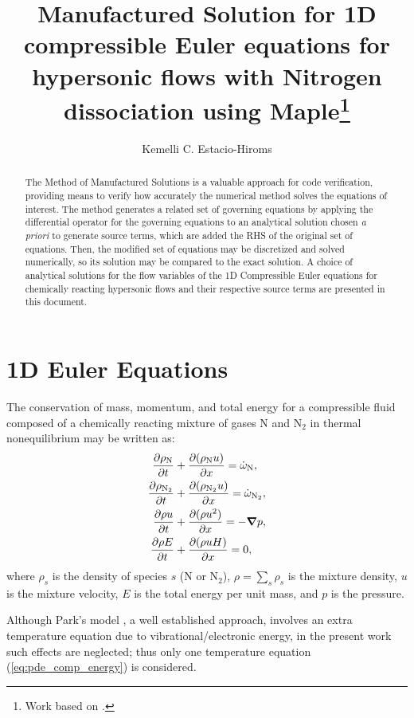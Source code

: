 \documentclass[10pt]{article}
\title{Manufactured Solution for 1D compressible Euler equations for hypersonic flows with Nitrogen dissociation using Maple\footnote{Work based on \citet*{Roy2002,Kirk2009}.}}
\author{Kemelli C. Estacio-Hiroms}
\newcommand{\Diff}[2] {\dfrac{\partial( #1)}{\partial #2}}
\newcommand{\diff}[2] {\dfrac{\partial #1 }{\partial #2}}
\newcommand{\gv}[1]{\ensuremath{\mbox{\boldmath$ #1 $}}}%
\newcommand{\grad}[1]{\gv{\nabla} #1}
\begin{document}
\maketitle

\begin{abstract}
The Method of Manufactured Solutions is a valuable approach for code verification, providing means to verify how accurately the numerical method solves the equations of interest. The method generates a related set of governing equations by applying the differential operator for the governing equations to an analytical solution chosen \textit{a priori} to generate source terms, which are added the RHS of the original set of equations. Then, the modified set of equations may be discretized and solved numerically, so its solution may be compared to the exact solution. A choice of analytical solutions for the flow variables of the 1D Compressible Euler equations for chemically reacting hypersonic flows and their respective source terms are presented in this document.
\end{abstract}




\section{1D Euler Equations}
The conservation of mass, momentum, and total energy for a compressible fluid composed of a chemically reacting mixture of gases N and N$_2$ in thermal nonequilibrium may be written as:
\begin{align}
 \label{eq:pde_comp_mass_N}
 \diff{\rho_{\text{N}}}{t} &+ \Diff{\rho_{\text{N}} u }{x} = \dot{\omega}_{\text{N}}, \\
\label{eq:pde_comp_mass_N2}
 \diff{\rho_{\text{N}_2}}{t} &+ \Diff{\rho_{\text{N}_2} u }{x} = \dot{\omega}_{\text{N}_2} ,\\
 \label{eq:pde_comp_mom}
 \diff{\rho u }{t} &+ \Diff{\rho u^2}{x} = -\grad{p} ,\\
 \label{eq:pde_comp_energy}
 \diff{\rho E}{t} &+ \Diff{\rho  u  H}{x}= 0,
\end{align}
where $\rho_s$ is the density of species $s$ (N or N$_2$), $\rho=\sum_s \rho_s$ is the mixture density, $ u $ is the mixture velocity, $E$ is the total energy per unit mass, and $p$ is the pressure.

Although Park's model \citep{Park1990}, a well established approach, involves an extra temperature equation due to vibrational/electronic energy, in the present work such effects are neglected; thus only one temperature equation (\ref{eq:pde_comp_energy}) is considered.
\end{document}
